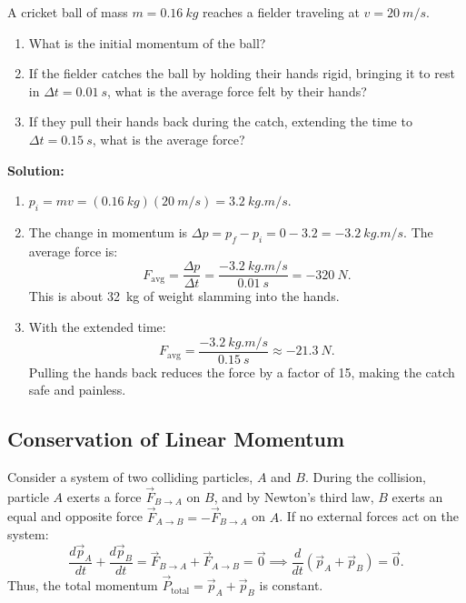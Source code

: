 \begin{workedexample}
A cricket ball of mass $m = \SI{0.16}{kg}$ reaches a fielder traveling at $v = \SI{20}{m/s}$.
\begin{enumerate}[label=(\alph*), itemsep=1pt]
  \item What is the initial momentum of the ball?
  \item If the fielder catches the ball by holding their hands rigid, bringing it to rest in $\Delta t = \SI{0.01}{s}$, what is the average force felt by their hands?
  \item If they pull their hands back during the catch, extending the time to $\Delta t = \SI{0.15}{s}$, what is the average force?
\end{enumerate}
\textbf{Solution:}
\begin{enumerate}[label=(\alph*)]
  \item $p_i = m v = (\SI{0.16}{kg})(\SI{20}{m/s}) = \SI{3.2}{kg.m/s}$.
  \item The change in momentum is $\Delta p = p_f - p_i = 0 - 3.2 = -\SI{3.2}{kg.m/s}$. The average force is:
        \begin{equation*}
            F_{\text{avg}} = \frac{\Delta p}{\Delta t} = \frac{-\SI{3.2}{kg.m/s}}{\SI{0.01}{s}} = -\SI{320}{N}.
        \end{equation*}
        This is about \SI{32}{kg} of weight slamming into the hands.
  \item With the extended time:
        \begin{equation*}
            F_{\text{avg}} = \frac{-\SI{3.2}{kg.m/s}}{\SI{0.15}{s}} \approx -\SI{21.3}{N}.
        \end{equation*}
        Pulling the hands back reduces the force by a factor of 15, making the catch safe and painless.
\end{enumerate}
\end{workedexample}

\subsection{Conservation of Linear Momentum}

Consider a system of two colliding particles, $A$ and $B$. During the collision, particle $A$ exerts a force $\vec{F}_{B \to A}$ on $B$, and by Newton's third law, $B$ exerts an equal and opposite force $\vec{F}_{A \to B} = -\vec{F}_{B \to A}$ on $A$. If no external forces act on the system:
\begin{equation}
    \frac{d\vec{p}_A}{dt} + \frac{d\vec{p}_B}{dt} = \vec{F}_{B \to A} + \vec{F}_{A \to B} = \vec{0} \implies \frac{d}{dt}(\vec{p}_A + \vec{p}_B) = \vec{0}.
\end{equation}
Thus, the total momentum $\vec{P}_{\text{total}} = \vec{p}_A + \vec{p}_B$ is constant.

